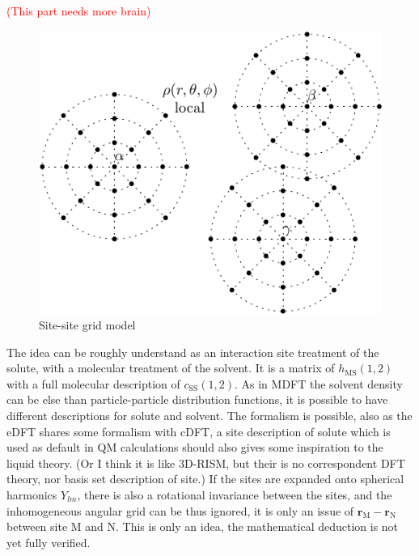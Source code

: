 \textcolor{red}{(This part needs more brain)}

\begin{figure}[h]
\begin{centering}
\includegraphics{_figure/site-site}
\par\end{centering}
\caption{Site-site grid model\label{fig:Site-site-grid-model}}
\end{figure}

The idea can be roughly understand as an interaction site treatment
of the solute, with a molecular treatment of the solvent. It is a
matrix of $h_{\text{MS}}(1,2)$ with a full molecular description
of $c_{\text{SS}}(1,2)$. As in \acs{MDFT} the solvent density can
be else than particle-particle distribution functions, it is possible
to have different descriptions for solute and solvent. The formalism
is possible, also as the e\acs{DFT} shares some formalism with c\acs{DFT},
a site description of solute which is used as default in \acs{QM}
calculations should also gives some inspiration to the liquid theory.
(Or I think it is like 3D-RISM, but their is no correspondent \acs{DFT}
theory, nor basis set description of site.) If the sites are expanded
onto spherical harmonics $Y_{lm}$, there is also a rotational invariance
between the sites, and the inhomogeneous angular grid can be thus
ignored, it is only an issue of $\mathbf{r}_{\text{M}}-\mathbf{r}_{\text{N}}$
between site M and N. This is only an idea, the mathematical deduction
is not yet fully verified.

